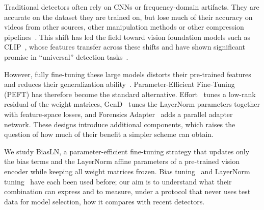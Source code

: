 \documentclass[fonts]{icst}
\begin{document}
Traditional detectors often rely on CNNs or frequency-domain artifacts. They are accurate on the dataset they are trained on, but lose much of their accuracy on videos from other sources, other manipulation methods or other compression pipelines~\cite{yan2023deepfakebench}.
This shift has led the field toward vision foundation models such as CLIP~\cite{radford2021clip_vitl}, whose features transfer across these shifts and have shown significant promise in ``universal'' detection tasks~\cite{ojha2023universal}.

However, fully fine-tuning these large models distorts their pre-trained features and reduces their generalization ability~\cite{kumar2022finetuning}.
Parameter-Efficient Fine-Tuning (PEFT) has therefore become the standard alternative. Effort~\cite{yan2025effort} tunes a low-rank residual of the weight matrices, GenD~\cite{yermakov2025gend} tunes the LayerNorm parameters together with feature-space losses, and Forensics Adapter~\cite{cui2025forada} adds a parallel adapter network. These designs introduce additional components, which raises the question of how much of their benefit a simpler scheme can obtain.

We study BiasLN, a parameter-efficient fine-tuning strategy that updates only the bias terms and the LayerNorm affine parameters of a pre-trained vision encoder while keeping all weight matrices frozen. Bias tuning~\cite{benzaken2022bitfit} and LayerNorm tuning~\cite{wang2022ln,yermakov2025gend} have each been used before; our aim is to understand what their combination can express and to measure, under a protocol that never uses test data for model selection, how it compares with recent detectors.
\end{document}
